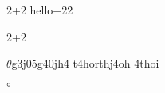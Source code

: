\documentclass[options]{article}
\begin{document}
2+2
hello+22

2+2

$\theta$g3j05g40jh4
t4horthj4oh
4thoi

$\circ$  
\end{document}
